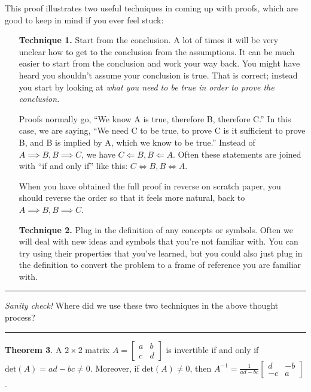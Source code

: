 \documentclass[11pt]{article}
\begin{document}
    This proof illustrates two useful techniques in coming up with proofs, which are
    good to keep in mind if you ever feel stuck:
    
    \begin{enumerate}
        \item[\textbf{Technique 1.}]
        Start from the conclusion. A lot of times it will be
        very unclear how to get to the conclusion from the assumptions. It can be
        much easier to start from the conclusion and work your way back. You might
        have heard you shouldn't assume your conclusion is true.
        That is correct; instead you start by looking at
        \textit{what you need to be true in order to prove the conclusion}.
        
        Proofs normally go, ``We know A is true, therefore B, therefore C.'' In this case,
        we are saying, ``We need C to be true, to prove C is it sufficient to prove B, and
        B is implied by A, which we know to be true.'' Instead of $A\implies B,B\implies C$,
        we have $C\Longleftarrow B, B\Longleftarrow A$. Often these statements are joined
        with ``if and only if'' like this: $C\iff B, B\iff A$.
        
        When you have obtained the full proof in reverse on scratch paper, you should 
        reverse the order so that it feels more natural, back to $A\implies B,B\implies C$.
        
        \item[\textbf{Technique 2.}]
        Plug in the definition of any concepts or symbols. Often we will deal with new
        ideas and symbols that you're not familiar with. You can try using their
        properties that you've learned, but you could also just plug in the definition
        to convert the problem to a frame of reference you are familiar with.
        
    \end{enumerate}

    \rule{\textwidth}{0.4pt}
    
    \vspace{-5pt}
    \textit{Sanity check!} Where did we use these two techniques in the above thought
    process?
    
    \vspace{-10pt}
    \rule{\textwidth}{0.4pt}


    \textbf{Theorem 3}. A $2\times2$ matrix $A=\begin{bmatrix}a & b \\ c & d\end{bmatrix}$
    is invertible if and only if $\mathrm{det}(A)=ad-bc\neq0$. Moreover, if
    $\mathrm{det}(A)\neq0$, then $A^{-1}=\frac1{ad-bc}\begin{bmatrix}
    d & -b \\ -c & a\end{bmatrix}$.
    
\end{document}
